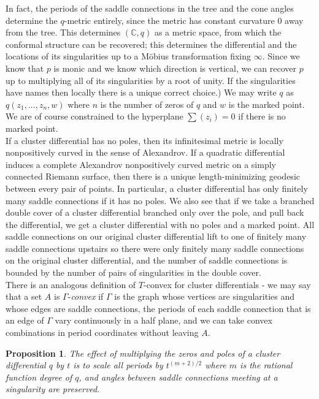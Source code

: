 \documentclass[12pt]{article}
\newtheorem{proposition}[theorem]{Proposition}
\newcommand{\cc}{\mathbb{C}}
\begin{document}
\noindent In fact, the periods of the saddle connections in the tree and the cone angles determine the $q$-metric entirely, since the metric has constant curvature $0$ away from the tree. This determines $(\cc,q)$ as a metric space, from which the conformal structure can be recovered; this determines the differential and the locations of its singularities up to a M\"obius transformation fixing $\infty$. Since we know that $p$ is monic and we know which direction is vertical, we can recover $p$ up to multiplying all of its singularities by a root of unity. If the singularities have names then locally there is a unique correct choice.) We may write $q$ as $q(z_1,...,z_n,w)$ where $n$ is the number of zeros of $q$ and $w$ is the marked point. We are of course constrained to the hyperplane $\sum(z_i) = 0$ if there is no marked point.\\

\noindent If a cluster differential has no poles, then its infinitesimal metric is locally nonpositively curved in the sense of Alexandrov. If a quadratic differential induces a complete Alexandrov nonpositively curved metric on a simply connected Riemann surface, then there is a unique length-minimizing geodesic between every pair of points. In particular, a cluster differential has only finitely many saddle connections if it has no poles. We also see that if we take a branched double cover of a cluster differential branched only over the pole, and pull back the differential, we get a cluster differential with no poles and a marked point. All saddle connections on our original cluster differential lift to one of finitely many saddle connections upstairs so there were only finitely many saddle connections on the original cluster differential, and the number of saddle connections is bounded by the number of pairs of singularities in the double cover.\\

\noindent There is an analogous definition of $T$-convex for cluster differentials - we may say that a set $A$ is $\Gamma$-\emph{convex} if $\Gamma$ is the graph whose vertices are singularities and whose edges are saddle connections, the periods of each saddle connection that is an edge of $\Gamma$ vary continuously in a half plane, and we can take convex combinations in period coordinates without leaving $A$.

\begin{proposition}\label{PropScale}The effect of multiplying the zeros and poles of a cluster differential $q$ by $t$ is to scale all periods by $t^{(m+2)/2}$ where $m$ is the rational function degree of $q$, and angles between saddle connections meeting at a singularity are preserved.\end{proposition}
\end{document}
